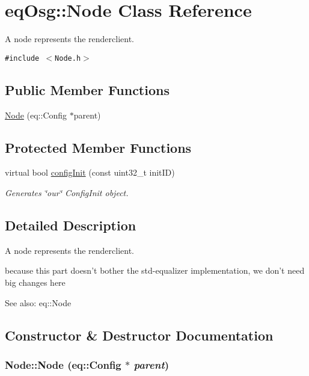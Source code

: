 \hypertarget{a00012}{
\section{eqOsg::Node Class Reference}
\label{a00012}
}
A node represents the renderclient.  


{\tt \#include $<$Node.h$>$}

\subsection*{Public Member Functions}
\begin{CompactItemize}
\item 
\hyperlink{a00012_31378a45a15dd93ae53ec380c54c1ded}{Node} (eq::Config $\ast$parent)
\end{CompactItemize}
\subsection*{Protected Member Functions}
\begin{CompactItemize}
\item 
virtual bool \hyperlink{a00012_ba19d8a715644e09e7c5490ff1932659}{configInit} (const uint32\_\-t initID)
\begin{CompactList}\small\item\em Generates \char`\"{}our\char`\"{} ConfigInit object. \item\end{CompactList}\end{CompactItemize}


\subsection{Detailed Description}
A node represents the renderclient. 

because this part doesn't bother the std-equalizer implementation, we don't need big changes here \begin{Desc}
\item[See also:]eq::Node \end{Desc}


\subsection{Constructor \& Destructor Documentation}
\hypertarget{a00012_31378a45a15dd93ae53ec380c54c1ded}{
\subsubsection[{Node}]{\setlength{\rightskip}{0pt plus 5cm}Node::Node (eq::Config $\ast$ {\em parent})}}
\label{a00012_31378a45a15dd93ae53ec380c54c1ded}



